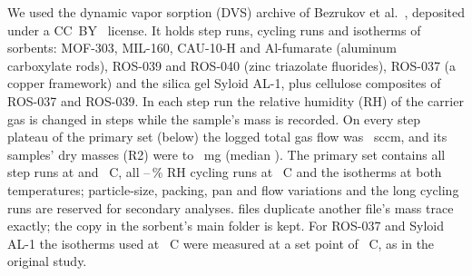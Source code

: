 \documentclass[12pt]{article}
\begin{document}
We used the dynamic vapor sorption (DVS) archive of Bezrukov et al.~\cite{Bezrukov2023Regeneration,Bezrukov2023Data},
deposited under a CC~BY~ license. It holds step runs, cycling runs and isotherms of 
sorbents: MOF-303, MIL-160, CAU-10-H and Al-fumarate (aluminum carboxylate rods), ROS-039 and ROS-040 (zinc
triazolate fluorides), ROS-037 (a copper framework) and the silica gel Syloid AL-1, plus cellulose composites of ROS-037 and
ROS-039. In each step run the relative humidity (RH) of the carrier gas is changed in steps while the sample's mass is
recorded. On every step plateau of the primary set (below) the logged total gas flow was ~sccm, and its
samples' dry masses (R2) were  to ~mg (median ). The primary set contains all step runs at  and ~\textdegree C, all
--\,\% RH cycling runs at ~\textdegree C and the isotherms at both
temperatures; particle-size, packing, pan and flow variations and the long cycling runs are reserved for secondary
analyses.  files duplicate another file's mass trace exactly; the copy in the sorbent's main folder
is kept. For ROS-037 and Syloid AL-1 the isotherms used at ~\textdegree C were measured at a set point of
~\textdegree C, as in the original study.
\end{document}
